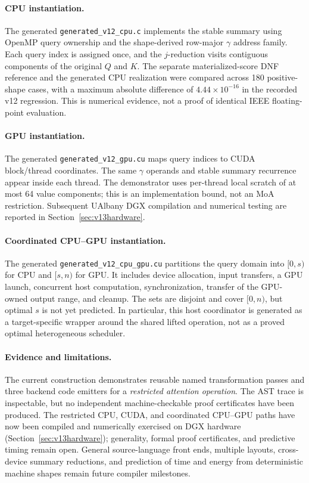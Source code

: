 \documentclass[11pt]{article}
\begin{document}
\paragraph{CPU instantiation.} The generated \texttt{generated\_v12\_cpu.c} implements the stable summary using OpenMP query ownership and the shape-derived row-major $\gamma$ address family. Each query index is assigned once, and the $j$-reduction visits contiguous components of the original $Q$ and $K$. The separate materialized-score DNF reference and the generated CPU realization were compared across 180 positive-shape cases, with a maximum absolute difference of $4.44\times10^{-16}$ in the recorded v12 regression. This is numerical evidence, not a proof of identical IEEE floating-point evaluation.

\paragraph{GPU instantiation.} The generated \texttt{generated\_v12\_gpu.cu} maps query indices to CUDA block/thread coordinates. The same $\gamma$ operands and stable summary recurrence appear inside each thread. The demonstrator uses per-thread local scratch of at most 64 value components; this is an implementation bound, not an MoA restriction. Subsequent UAlbany DGX compilation and numerical testing are reported in Section~\ref{sec:v13hardware}.

\paragraph{Coordinated CPU--GPU instantiation.} The generated \texttt{generated\_v12\_cpu\_gpu.cu} partitions the query domain into $[0,s)$ for CPU and $[s,n)$ for GPU. It includes device allocation, input transfers, a GPU launch, concurrent host computation, synchronization, transfer of the GPU-owned output range, and cleanup. The sets are disjoint and cover $[0,n)$, but optimal $s$ is not yet predicted. In particular, this host coordinator is generated as a target-specific wrapper around the shared lifted operation, not as a proved optimal heterogeneous scheduler.

\paragraph{Evidence and limitations.} The current construction demonstrates reusable named transformation passes and three backend code emitters for a \emph{restricted attention operation}. The AST trace is inspectable, but no independent machine-checkable proof certificates have been produced. The restricted CPU, CUDA, and coordinated CPU--GPU paths have now been compiled and numerically exercised on DGX hardware (Section~\ref{sec:v13hardware}); generality, formal proof certificates, and predictive timing remain open. General source-language front ends, multiple layouts, cross-device summary reductions, and prediction of time and energy from deterministic machine shapes remain future compiler milestones.
\end{document}
